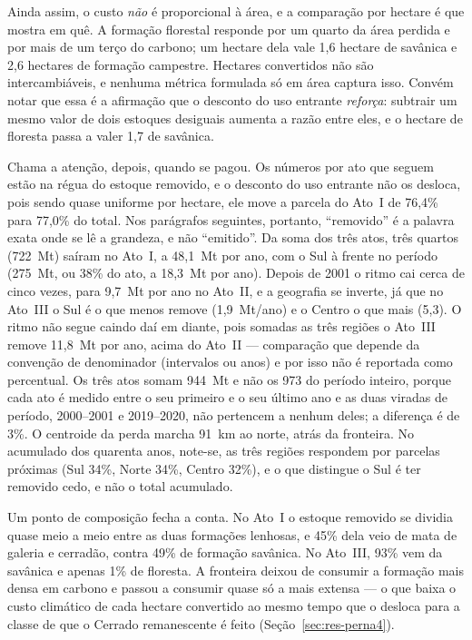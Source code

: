 Ainda assim, o custo \emph{não} é proporcional à área, e a comparação por
hectare é que mostra em quê. A formação florestal responde por um quarto da
área perdida e por mais de um terço do carbono; um hectare dela vale 1,6
hectare de savânica e 2,6 hectares de formação campestre. Hectares convertidos
não são intercambiáveis, e nenhuma métrica formulada só em área captura isso.
Convém notar que essa é a afirmação que o desconto do uso entrante \emph{reforça}:
subtrair um mesmo valor de dois estoques desiguais aumenta a razão entre eles,
e o hectare de floresta passa a valer 1,7 de savânica.

Chama a atenção, depois, quando se pagou. Os números por ato que seguem estão na
régua do estoque removido, e o desconto do uso entrante não os desloca, pois sendo
quase uniforme por hectare, ele move a parcela do Ato~I de 76,4\% para
77,0\% do total. Nos parágrafos seguintes, portanto, ``removido'' é a palavra
exata onde se lê a grandeza, e não ``emitido''. Da soma dos três atos, três
quartos (722~Mt) saíram no Ato~I, a 48,1~Mt por ano, com o Sul à frente no
período (275~Mt, ou 38\% do ato, a 18,3~Mt por ano). Depois de 2001 o ritmo
cai cerca de cinco vezes, para 9,7~Mt por ano no Ato~II, e a geografia se inverte, já que no Ato~III o
Sul é o que menos remove (1,9~Mt/ano) e o Centro o que mais (5,3). O ritmo não
segue caindo daí em diante, pois somadas as três regiões o Ato~III remove
11,8~Mt por ano, acima do Ato~II --- comparação que depende da convenção de denominador
(intervalos ou anos) e por isso não é reportada como percentual. Os três atos
somam 944~Mt e não os 973 do período inteiro, porque cada ato é medido entre o
seu primeiro e o seu último ano e as duas viradas de período, 2000--2001 e
2019--2020, não pertencem a nenhum deles; a diferença é de 3\%. O centroide da
perda marcha 91~km ao norte, atrás da fronteira. No acumulado dos quarenta
anos, note-se, as três regiões respondem por parcelas próximas (Sul 34\%, Norte 34\%,
Centro 32\%), e o que distingue o Sul é ter removido cedo, e não o total
acumulado.

Um ponto de composição fecha a conta. No Ato~I o estoque removido se dividia quase
meio a meio entre as duas formações lenhosas, e 45\% dela veio de mata de galeria
e cerradão, contra 49\% de formação savânica. No Ato~III, 93\% vem da savânica
e apenas 1\% de floresta. A fronteira deixou de consumir a formação mais densa
em carbono e passou a consumir quase só a mais extensa --- o que baixa o custo
climático de cada hectare convertido ao mesmo tempo que o desloca para a classe
de que o Cerrado remanescente é feito (Seção~\ref{sec:res-perna4}).

